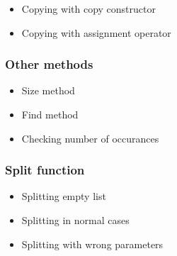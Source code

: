 \documentclass{article}
\begin{document}
\begin{itemize}
    \item Copying with copy constructor
    \item Copying with assignment operator
\end{itemize}

\subsubsection*{Other methods}

\begin{itemize}
    \item Size method
    \item Find method
    \item Checking number of occurances
\end{itemize}

\subsubsection*{Split function}

\begin{itemize}
    \item Splitting empty list
    \item Splitting in normal cases
    \item Splitting with wrong parameters
\end{itemize}
\end{document}
